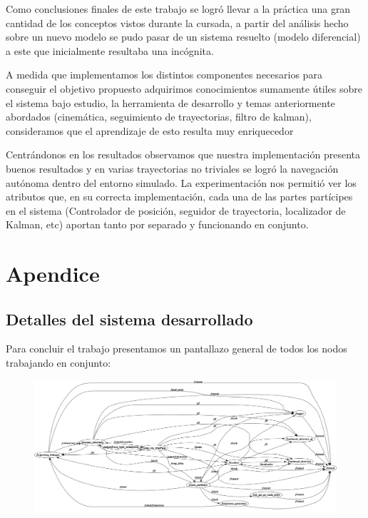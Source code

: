 Como conclusiones finales de este trabajo se logró llevar a la práctica una gran cantidad de los conceptos vistos durante la cursada, a partir del análisis hecho sobre un nuevo modelo se pudo pasar de un sistema resuelto (modelo diferencial) a este que inicialmente resultaba una incógnita. 

A medida que implementamos los distintos componentes necesarios para conseguir el objetivo propuesto adquirimos conocimientos sumamente útiles sobre el sistema bajo estudio, la herramienta de desarrollo y temas anteriormente abordados (cinemática, seguimiento de trayectorias, filtro de kalman), consideramos que el aprendizaje de esto resulta muy enriquecedor 

Centrándonos en los resultados observamos que nuestra implementación presenta buenos resultados y en varias trayectorias no triviales se logró la navegación autónoma dentro del entorno simulado. La experimentación nos permitió ver los atributos que, en su correcta implementación, cada una de las partes partícipes en el sistema (Controlador de posición, seguidor de trayectoria, localizador de Kalman, etc) aportan tanto por separado y funcionando en conjunto.

\pagebreak
\section{Apendice}

\subsection{Detalles del sistema desarrollado}

Para concluir el trabajo presentamos un pantallazo general de todos los nodos trabajando en conjunto:

\begin{figure}[!htb]
\begin{center}
\includegraphics[width=\linewidth]{rqtgraphekf.png} 
\end{center}
\end{figure}

